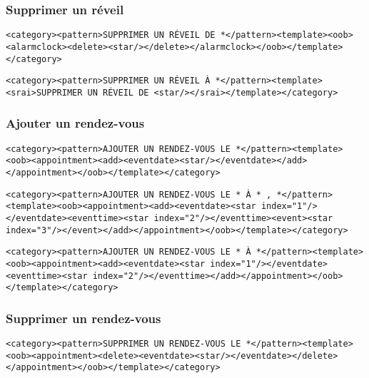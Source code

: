 \subsubsection{Supprimer un réveil}
\begin{lstlisting}[frame=none,aboveskip=0.5em]
<category><pattern>SUPPRIMER UN RÉVEIL DE *</pattern><template><oob>
<alarmclock><delete><star/></delete></alarmclock></oob></template></category>
\end{lstlisting}

\begin{lstlisting}[frame=none,aboveskip=0.5em]
<category><pattern>SUPPRIMER UN RÉVEIL À *</pattern><template><srai>SUPPRIMER UN RÉVEIL DE <star/></srai></template></category>
\end{lstlisting}

\subsubsection{Ajouter un rendez-vous}
\begin{lstlisting}[frame=none,aboveskip=0.5em]
<category><pattern>AJOUTER UN RENDEZ-VOUS LE *</pattern><template><oob><appointment><add><eventdate><star/></eventdate></add></appointment></oob></template></category>
\end{lstlisting}

\begin{lstlisting}[frame=none,aboveskip=0.5em]
<category><pattern>AJOUTER UN RENDEZ-VOUS LE * À * , *</pattern><template><oob><appointment><add><eventdate><star index="1"/></eventdate><eventtime><star index="2"/></eventtime><event><star index="3"/></event></add></appointment></oob></template></category>
\end{lstlisting}

\begin{lstlisting}[frame=none,aboveskip=0.5em]
<category><pattern>AJOUTER UN RENDEZ-VOUS LE * À *</pattern><template><oob><appointment><add><eventdate><star index="1"/></eventdate><eventtime><star index="2"/></eventtime></add></appointment></oob></template></category>
\end{lstlisting}

\subsubsection{Supprimer un rendez-vous}
\begin{lstlisting}[frame=none,aboveskip=0.5em]
<category><pattern>SUPPRIMER UN RENDEZ-VOUS LE *</pattern><template><oob><appointment><delete><eventdate><star/></eventdate></delete></appointment></oob></template></category>
\end{lstlisting}

